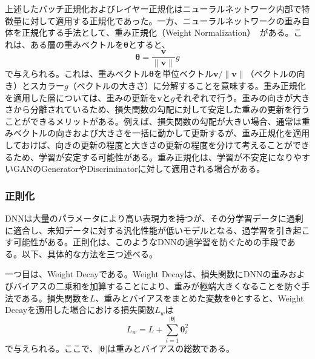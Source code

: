 \documentclass[12pt]{jarticle}
\numberwithin{equation}{section}    %
\numberwithin{figure}{section}      %
\numberwithin{table}{section}      %
\begin{document}
上述したバッチ正規化およびレイヤー正規化はニューラルネットワーク内部で特徴量に対して適用する正規化であった。一方、ニューラルネットワークの重み自体を正規化する手法として、重み正規化（Weight Normalization）~\cite{salimans2016weight}がある。これは、ある層の重みベクトルを$\bm{\theta}$とすると、
\begin{equation}
    \bm{\theta} = \frac{\bm{v}}{\| \bm{v} \|} g
\end{equation}
で与えられる。これは、重みベクトル$\bm{\theta}$を単位ベクトル$\bm{v} / \| \bm{v} \|$（ベクトルの向き）とスカラー$g$（ベクトルの大きさ）に分解することを意味する。重み正規化を適用した層については、重みの更新を$\bm{v}$と$g$それぞれで行う。重みの向きが大きさから分離されているため、損失関数の勾配に対して安定した重みの更新を行うことができるメリットがある。例えば、損失関数の勾配が大きい場合、通常は重みベクトルの向きおよび大きさを一括に動かして更新するが、重み正規化を適用しておけば、向きの更新の程度と大きさの更新の程度を分けて考えることができるため、学習が安定する可能性がある。重み正規化は、学習が不安定になりやすいGANのGeneratorやDiscriminatorに対して適用される場合がある。

\subsubsection{正則化}
DNNは大量のパラメータにより高い表現力を持つが、その分学習データに過剰に適合し、未知データに対する汎化性能が低いモデルとなる、過学習を引き起こす可能性がある。正則化は、このようなDNNの過学習を防ぐための手段である。以下、具体的な方法を三つ述べる。

一つ目は、Weight Decayである。Weight Decayは、損失関数にDNNの重みおよびバイアスの二乗和を加算することにより、重みが極端大きくなることを防ぐ手法である。損失関数を$L$、重みとバイアスをまとめた変数を$\bm{\theta}$とすると、Weight Decayを適用した場合における損失関数$L_{w}$は
\begin{equation}
    L_{w} = L + \sum_{i = 1}^{| \bm{\theta} |} \bm{\theta}_{i}^{2}
\end{equation}
で与えられる。ここで、$|\bm{\theta}|$は重みとバイアスの総数である。
\end{document}
